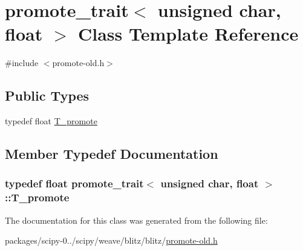 \hypertarget{classpromote__trait_3_01unsigned_01char_00_01float_01_4}{}\section{promote\+\_\+trait$<$ unsigned char, float $>$ Class Template Reference}
\label{classpromote__trait_3_01unsigned_01char_00_01float_01_4}


{\ttfamily \#include $<$promote-\/old.\+h$>$}

\subsection*{Public Types}
\begin{DoxyCompactItemize}
\item 
typedef float \hyperlink{classpromote__trait_3_01unsigned_01char_00_01float_01_4_a80e4cfa9330bcc70bef67fa734205484}{T\+\_\+promote}
\end{DoxyCompactItemize}


\subsection{Member Typedef Documentation}
\hypertarget{classpromote__trait_3_01unsigned_01char_00_01float_01_4_a80e4cfa9330bcc70bef67fa734205484}{}
\subsubsection[{T\+\_\+promote}]{\setlength{\rightskip}{0pt plus 5cm}typedef float {\bf promote\+\_\+trait}$<$ unsigned char, float $>$\+::{\bf T\+\_\+promote}}\label{classpromote__trait_3_01unsigned_01char_00_01float_01_4_a80e4cfa9330bcc70bef67fa734205484}


The documentation for this class was generated from the following file\+:\begin{DoxyCompactItemize}
\item 
packages/scipy-\/0../scipy/weave/blitz/blitz/\hyperlink{promote-old_8h}{promote-\/old.\+h}\end{DoxyCompactItemize}
